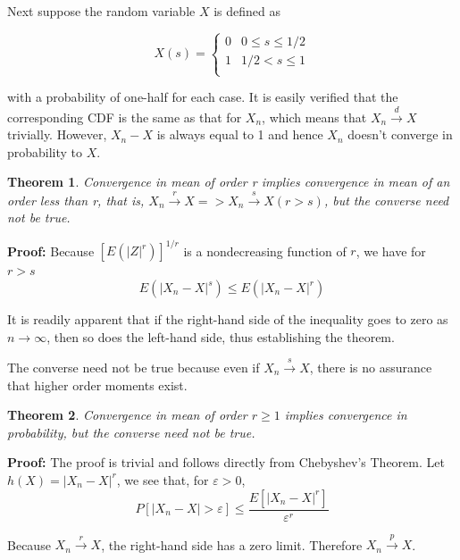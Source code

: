 \documentclass{article}
\newtheorem{theorem}{Theorem}[section]
\begin{document}
Next suppose the random variable \(X\) is defined as

\begin{equation*}
    X(s)=\left\{
    \begin{array}{ll}
        0 & 0 \leq s \leq 1/2 \\
        1 & 1/2 < s \leq 1 \\
    \end{array}
\right.
\end{equation*}

with a probability of one-half for each case. It is easily verified that the corresponding CDF is the same as that for \(X_n\), which means that \(X_n \stackrel{d} \longrightarrow X\) trivially. However, \(X_n-X\) is always equal to 1 and hence \(X_n\) doesn't converge in probability to \(X\).

\begin{theorem}
    Convergence in mean of order r implies convergence in mean of an order less than r, that is, \(X_n \stackrel{r} \longrightarrow X => X_n \stackrel{s} \longrightarrow X (r>s)\), but the converse need not be true.
\end{theorem}

\textbf{Proof:} Because \([E(|Z|^r)]^{1/r}\) is a nondecreasing function of \(r\), we have for \(r>s\)
\begin{equation*}
    E(|X_n-X|^s) \leq E(|X_n-X|^r)
\end{equation*}

It is readily apparent that if the right-hand side of the inequality goes to zero as \(n \rightarrow \infty\), then so does the left-hand side, thus establishing the theorem.

The converse need not be true because even if \(X_n \stackrel{s} \longrightarrow X\), there is no assurance that higher order moments exist.

\begin{theorem}
    Convergence in mean of order \(r \geq 1\) implies convergence in probability, but the converse need not be true.
\end{theorem}

\textbf{Proof:} The proof is trivial and follows directly from Chebyshev's Theorem. Let \(h(X)=|X_n-X|^r\), we see that, for \(\varepsilon>0\),
\begin{equation*}
    P[|X_n-X|>\varepsilon] \leq \frac{E[|X_n-X|^r]}{\varepsilon^r}
\end{equation*}

Because \(X_n \stackrel{r} \longrightarrow X\), the right-hand side has a zero limit. Therefore \(X_n \stackrel{p} \longrightarrow X\).
\end{document}
